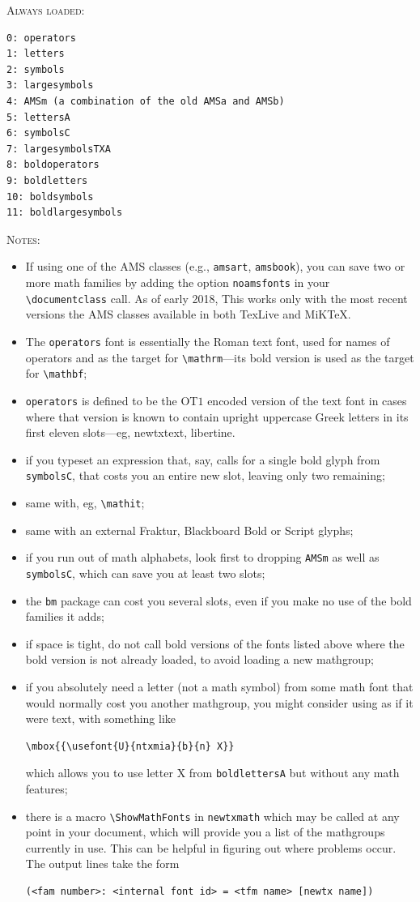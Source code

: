 \documentclass[\fsc]{article}
\theoremstyle{oldplain}
\theoremstyle{plain}
\begin{document}
\textsc{Always loaded:}
\begin{verbatim}
0: operators
1: letters
2: symbols
3: largesymbols
4: AMSm (a combination of the old AMSa and AMSb)
5: lettersA
6: symbolsC
7: largesymbolsTXA
8: boldoperators
9: boldletters
10: boldsymbols
11: boldlargesymbols
\end{verbatim}
\textsc{Notes:}
\begin{itemize}
\item If using one of the AMS classes (e.g., {\tt amsart}, {\tt amsbook}), you can save two or more math families by adding the option {\tt noamsfonts} in your \verb|\documentclass| call. As of early 2018, This works only with the most recent versions the AMS classes available in both TexLive and MiKTeX. 
\item
The {\tt operators} font is essentially the Roman text font, used for names of operators and as the target for \verb|\mathrm|---its bold version is used as the target for \verb|\mathbf|;
\item {\tt operators} is defined to be the OT$1$ encoded version of the text font in cases where that version is known to contain upright uppercase Greek letters in its first eleven slots---eg, newtxtext, libertine.
\item if you typeset an expression that, say, calls for a single bold glyph from  {\tt symbolsC}, that costs you an entire new slot, leaving only two remaining;
\item same with, eg, \verb|\mathit|;
\item same with an external Fraktur, Blackboard Bold or Script glyphs;
\item if you run out of math alphabets, look first to dropping {\tt AMSm}  as well as {\tt symbolsC}, which can save you at least two slots;
\item the {\tt bm} package can cost you several slots, even if you make no use of the bold families it adds;
\item if space is tight, do not call bold versions of the fonts listed above where the bold version is not already loaded, to avoid loading a new mathgroup; 
\item if you absolutely need a letter (not a math symbol) from some math font that would normally cost you another mathgroup, you might consider using as if it were text, with something like
\begin{verbatim}
\mbox{{\usefont{U}{ntxmia}{b}{n} X}}
\end{verbatim}
which allows you to use letter X from {\tt boldlettersA} but without any math features;
\item there is a macro \verb|\ShowMathFonts| in {\tt newtxmath} which may be called at any point in your document, which will provide you a list of the mathgroups currently in use. This can be helpful in figuring out where problems occur. The output lines take the form
\begin{verbatim}
(<fam number>: <internal font id> = <tfm name> [newtx name])
\end{verbatim}

\end{itemize}
\end{document}
